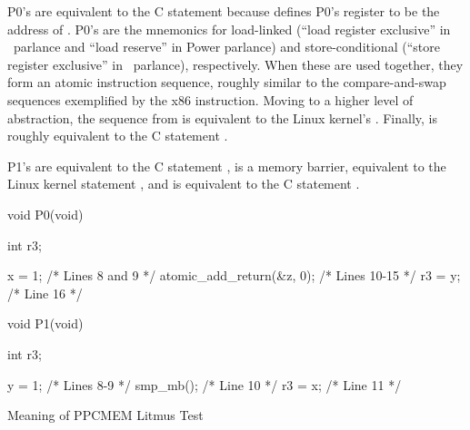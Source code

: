 \begin{fcvref}
\begin{fcvref}
P0's  are equivalent to the C statement 
because  defines P0's register  to be the address
of . P0's  are the mnemonics for
load-linked (``load register
exclusive'' in \ARM\ parlance and ``load reserve'' in Power parlance)
and store-conditional (``store register exclusive'' in \ARM\ parlance),
respectively. When these are used together, they form an atomic
instruction sequence, roughly similar to the compare-and-swap sequences
exemplified by the x86  instruction. Moving to a higher
level of abstraction, the sequence from 
is equivalent to the Linux kernel's .
Finally,  is
roughly equivalent to the C statement .

P1's  are equivalent to the C statement ,
is a memory barrier, equivalent to the Linux kernel statement ,
and  is equivalent to the C statement .
\end{fcvref}

\QuickQuizEnd

\begin{listing}[tbp]
\begin{VerbatimL}
void P0(void)
{
	int r3;

	x = 1; /* Lines 8 and 9 */
	atomic_add_return(&z, 0); /* Lines 10-15 */
	r3 = y; /* Line 16 */
}

void P1(void)
{
	int r3;

	y = 1; /* Lines 8-9 */
	smp_mb(); /* Line 10 */
	r3 = x; /* Line 11 */
}
\end{VerbatimL}
\caption{Meaning of PPCMEM Litmus Test}
\label{lst:formal:Meaning of PPCMEM Litmus Test}
\end{listing}


\end{fcvref}
